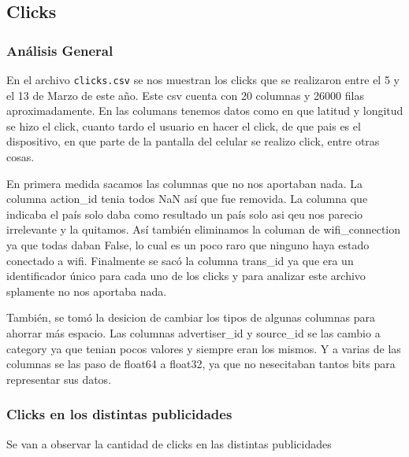 \documentclass[a4paper, 12pt]{article}
\newcommand\tab[1][1cm]{\hspace*{#1}}
\begin{document}
\clearpage
\subsection{Clicks}
	\subsubsection{Análisis General}
		
		\tab En el archivo \texttt{clicks.csv} se nos muestran los clicks que se realizaron entre el 5 y el 13 de Marzo de este año. Este csv cuenta con 20 columnas y 26000 filas aproximadamente. En las columans tenemos datos como en que latitud y longitud se hizo el click, cuanto tardo el usuario en hacer el click, de que pais es el dispositivo, en que parte de la pantalla del celular se realizo click, entre otras cosas.
		
		\tab En primera medida sacamos las columnas que no nos aportaban nada. La columna action\_id tenia todos NaN así que fue removida. La columna que indicaba el país solo daba como resultado un país solo asi qeu nos parecio irrelevante y la quitamos. Así también eliminamos la columan de wifi\_connection ya que todas daban False, lo cual es un poco raro que ninguno haya estado conectado a wifi. Finalmente se sacó la columna trans\_id ya que era un identificador único para cada uno de los clicks y para analizar este archivo splamente no nos aportaba nada.
		
		\tab También, se tomó la desicion de cambiar los tipos de algunas columnas para ahorrar más espacio. Las columnas advertiser\_id y source\_id se las cambio a category ya que tenian pocos valores y siempre eran los mismos. Y a varias de las columnas se las paso de float64 a float32, ya que no nesecitaban tantos bits para representar sus datos.

	\subsubsection{Clicks en los distintas publicidades}
		\tab Se van a observar la cantidad de clicks en las distintas publicidades
\end{document}
